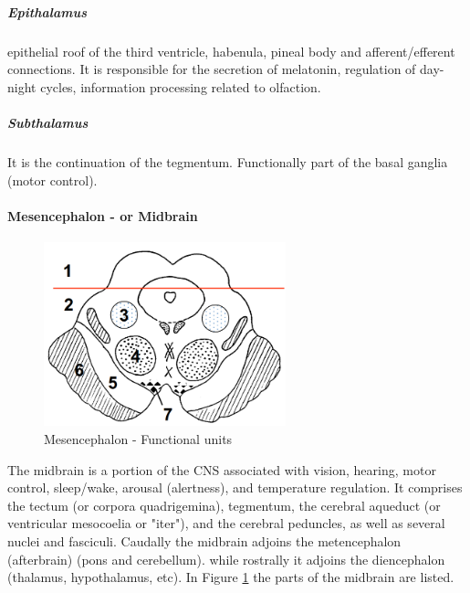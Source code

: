 \documentclass[12pt,article,oneside,a4paper]{memoir}
\begin{document}
\subparagraph{Epithalamus}
epithelial roof of the third ventricle, habenula, pineal body and afferent/efferent connections. It is responsible for the secretion of melatonin, regulation of day-night cycles, information processing related to olfaction.

\subparagraph{Subthalamus}
It is the continuation of the tegmentum. Functionally part of the basal ganglia (motor control).

\newpage

\paragraph{Mesencephalon - or Midbrain}
\begin{figure}
	\centering
  	\includegraphics[width=7cm]{imgs/mesencephalon.png}
	\caption{Mesencephalon - Functional units}
  	\label{fig:mesencephalon}
\end{figure}

The midbrain is a portion of the CNS associated with vision, hearing, motor control, sleep/wake, arousal (alertness), and temperature regulation. It comprises the tectum (or corpora quadrigemina), tegmentum, the cerebral aqueduct (or ventricular mesocoelia or "iter"), and the cerebral peduncles, as well as several nuclei and fasciculi. Caudally the midbrain adjoins the metencephalon (afterbrain) (pons and cerebellum). while rostrally it adjoins the diencephalon (thalamus, hypothalamus, etc). In Figure  \ref{fig:mesencephalon} the parts of the midbrain are listed.
\end{document}
